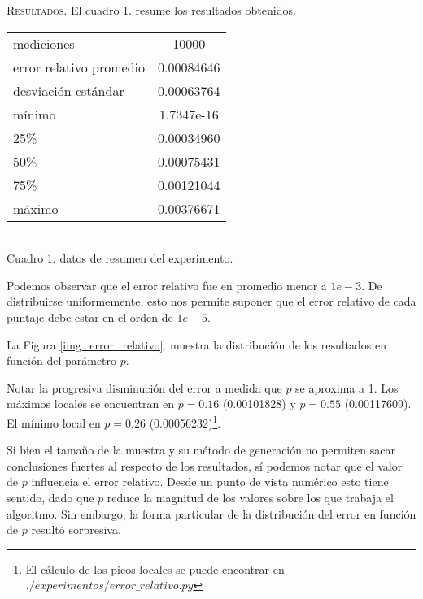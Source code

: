 \noindent \textsc{Resultados}. El cuadro 1. resume los resultados obtenidos. 
\vspace{1.5em}

\begin{center}
    \begin{tabular}{ |l|c| } 
     \hline
    mediciones              & 10000         \\
    error relativo promedio & 0.00084646    \\
    desviación estándar     & 0.00063764    \\
    mínimo                  & 1.7347e-16    \\
    25\%                    & 0.00034960    \\
    50\%                    & 0.00075431    \\
    75\%                    & 0.00121044    \\
    máximo                  & 0.00376671    \\
    \hline
    \end{tabular} \\
    \bigskip
    Cuadro 1. datos de resumen del experimento. 
\end{center}
\vspace{1em}

Podemos observar que el error relativo fue en promedio menor a $1e-3$. De distribuirse uniformemente, esto nos permite suponer que el error relativo de cada puntaje debe estar en el orden de $1e-5$.
\vspace{1em}

La Figura \ref{img_error_relativo}. muestra la distribución de los resultados en función del parámetro $p$.

\vspace{1em}

Notar la progresiva disminución del error a medida que $p$ se aproxima a 1. Los máximos locales se encuentran en $p = 0.16$ (0.00101828)  y $p = 0.55$ (0.00117609). El mínimo local en $p = 0.26$ (0.00056232)\footnote{El cálculo de los picos locales se puede encontrar en $./experimentos/error\_relativo.py$}. 

\vspace{1em}
Si bien el tamaño de la muestra y su método de generación no permiten sacar conclusiones fuertes al respecto de los resultados, sí podemos notar que el valor de $p$ influencia el error relativo. Desde un punto de vista numérico esto tiene sentido, dado que $p$ reduce la  magnitud de los valores sobre los que trabaja el algoritmo. Sin embargo, la forma particular de la distribución del error en función de $p$ resultó sorpresiva. 

